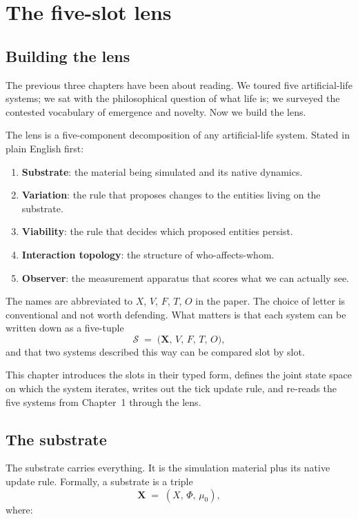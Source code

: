 \chapter{The five-slot lens}

\section{Building the lens}

The previous three chapters have been about reading. We toured five
artificial-life systems; we sat with the philosophical question of what
life is; we surveyed the contested vocabulary of emergence and novelty.
Now we build the lens.

The lens is a five-component decomposition of any artificial-life system.
Stated in plain English first:

\begin{enumerate}[leftmargin=2em,itemsep=2pt]
  \item \textbf{Substrate}: the material being simulated and its native
    dynamics.
  \item \textbf{Variation}: the rule that proposes changes to the
    entities living on the substrate.
  \item \textbf{Viability}: the rule that decides which proposed
    entities persist.
  \item \textbf{Interaction topology}: the structure of who-affects-whom.
  \item \textbf{Observer}: the measurement apparatus that scores what we
    can actually see.
\end{enumerate}

The names are abbreviated to $X$, $V$, $F$, $T$, $O$ in the paper. The
choice of letter is conventional and not worth defending. What matters is
that each system can be written down as a five-tuple
\[
  \mathcal{S} \;=\; \big(\mathbf{X},\, V,\, F,\, T,\, O\big),
\]
and that two systems described this way can be compared slot by slot.

This chapter introduces the slots in their typed form, defines the joint
state space on which the system iterates, writes out the tick update
rule, and re-reads the five systems from Chapter~1 through the lens.

\section{The substrate}

The substrate carries everything. It is the simulation material plus its
native update rule. Formally, a substrate is a triple
\[
  \mathbf{X} \;=\; (X,\, \Phi,\, \mu_0),
\]
where:

